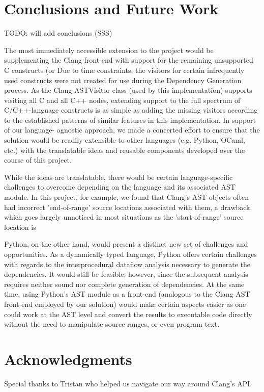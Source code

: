 \documentclass[preprint]{acm_proc_article-sp}
\begin{document}
\section{Conclusions and Future Work}
TODO: will add conclusions (SSS)

The most immediately accessible extension to the project would be supplementing
the Clang front-end with support for the remaining unsupported C constructs (or
Due to time constraints, the visitors for certain infrequently used constructs
were not created for use during the Dependency Generation process. As the Clang
ASTVisitor class (used by this implementation) supports visiting all C and all
C++ nodes, extending support to the full spectrum of C/C++-language constructs
is as simple as adding the missing visitors according to the established
patterns of similar features in this implementation. In support of our language-
agnostic approach, we made a concerted effort to ensure that the solution would
be readily extensible to other languages (e.g. Python, OCaml, etc.) with the
translatable ideas and reusable components developed over the course of this
project.

While the ideas are translatable, there would be certain language-specific
challenges to overcome depending on the language and its associated AST module.
In this project, for example, we found that Clang's AST objects often had
incorrect 'end-of-range' source locations associated with them, a drawback which
goes largely unnoticed in most situations as the 'start-of-range' source
location is


Python, on the other hand, would present a distinct new set of challenges and
opportunities. As a dynamically typed language, Python offers certain challenges
with regards to the interprocedural dataflow analysis necessary to generate the
dependencies. It would still be feasible, however, since the subsequent analysis
requires neither sound nor complete generation of dependencies. At the same
time, using Python's AST module as a front-end (analogous to the Clang AST
front-end employed by our solution) would make certain aspects easier as one
could work at the AST level and convert the results to executable code directly
without the need to manipulate source ranges, or even program text.

\section{Acknowledgments}

Special thanks to Tristan who helped us navigate our way around Clang's API.



\end{document}
